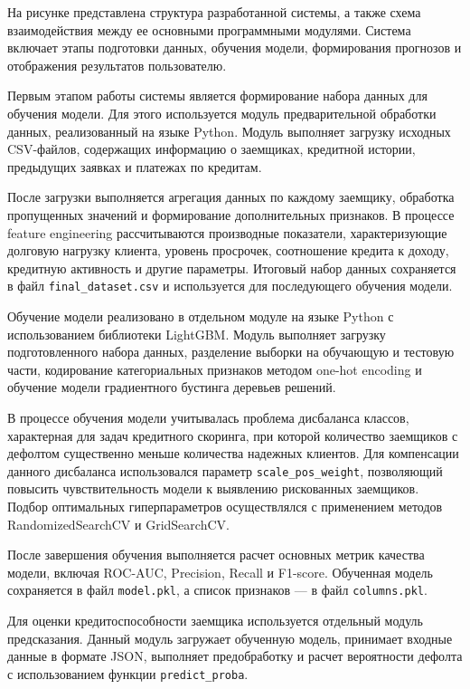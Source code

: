 На рисунке представлена структура разработанной системы, а также схема взаимодействия между ее основными программными модулями. Система включает этапы подготовки данных, обучения модели, формирования прогнозов и отображения результатов пользователю.

Первым этапом работы системы является формирование набора данных для обучения модели. Для этого используется модуль предварительной обработки данных, реализованный на языке Python. Модуль выполняет загрузку исходных CSV-файлов, содержащих информацию о заемщиках, кредитной истории, предыдущих заявках и платежах по кредитам.

После загрузки выполняется агрегация данных по каждому заемщику, обработка пропущенных значений и формирование дополнительных признаков. В процессе feature engineering рассчитываются производные показатели, характеризующие долговую нагрузку клиента, уровень просрочек, соотношение кредита к доходу, кредитную активность и другие параметры. Итоговый набор данных сохраняется в файл \texttt{final\_dataset.csv} и используется для последующего обучения модели.

Обучение модели реализовано в отдельном модуле на языке Python с использованием библиотеки LightGBM. Модуль выполняет загрузку подготовленного набора данных, разделение выборки на обучающую и тестовую части, кодирование категориальных признаков методом one-hot encoding и обучение модели градиентного бустинга деревьев решений.

В процессе обучения модели учитывалась проблема дисбаланса классов, характерная для задач кредитного скоринга, при которой количество заемщиков с дефолтом существенно меньше количества надежных клиентов. Для компенсации данного дисбаланса использовался параметр \texttt{scale\_pos\_weight}, позволяющий повысить чувствительность модели к выявлению рискованных заемщиков. Подбор оптимальных гиперпараметров осуществлялся с применением методов RandomizedSearchCV и GridSearchCV.

После завершения обучения выполняется расчет основных метрик качества модели, включая ROC-AUC, Precision, Recall и F1-score. Обученная модель сохраняется в файл \texttt{model.pkl}, а список признаков — в файл \texttt{columns.pkl}.

Для оценки кредитоспособности заемщика используется отдельный модуль предсказания. Данный модуль загружает обученную модель, принимает входные данные в формате JSON, выполняет предобработку и расчет вероятности дефолта с использованием функции \texttt{predict\_proba}.

